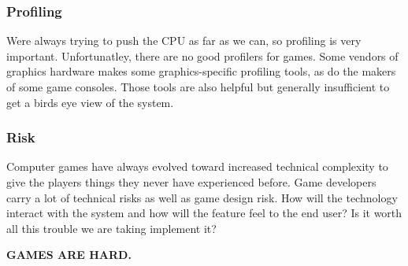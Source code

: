     \subsubsection*{Profiling}
    Were always trying to push the CPU as far as we can, so profiling is very important. Unfortunatley, there are no good profilers for games. Some vendors of graphics hardware makes some graphics-specific profiling tools, as do the makers of some game consoles. Those tools are also helpful but generally insufficient to get a birds eye view of the system. 

    \subsubsection*{Risk}
    Computer games have always evolved toward increased technical complexity to give the players things they never have experienced before. Game developers carry a lot of technical risks as well as game design risk. How will the technology interact with the system and how will the feature feel to the end user? Is it worth all this trouble we are taking implement it?

    {\bf GAMES ARE HARD.}
